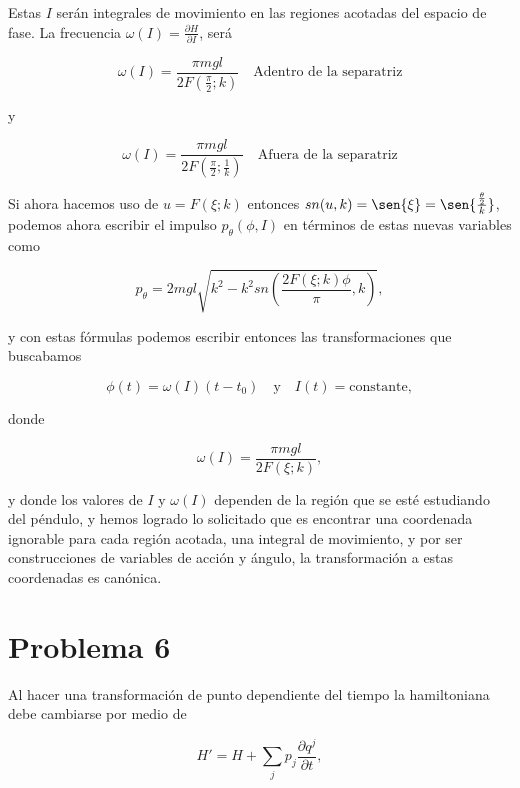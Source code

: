 \documentclass[a4paper,10pt]{article}
\numberwithin{equation}{section}
\begin{document}
Estas $I$ serán integrales de movimiento en las regiones acotadas del espacio de fase. 
La frecuencia $\omega(I) = \frac{\partial H}{\partial I}$, será 

\begin{equation}
 \omega(I) = \frac{\pi mgl}{2F\left(\frac{\pi}{2};k\right)} \quad \text{Adentro de la 
 separatriz}
\end{equation}

y 

\begin{equation}
 \omega(I) = \frac{\pi mgl}{2F\left(\frac{\pi}{2};\frac{1}{k}\right)} \quad \text{Afuera de la 
 separatriz}
\end{equation}

Si ahora hacemos uso de $u = F(\xi;k)$ entonces $sn(u,k) = \sen{\xi} = \sen{\frac{\frac{\theta}{2}}{k}}$, 
podemos ahora escribir el impulso $p_\theta(\phi,I)$ en términos de estas nuevas variables 
como 

\begin{equation}
 p_\theta = 2mgl \sqrt{k^2 - k^2sn\left(\frac{2F(\xi;k)\phi}{\pi},k \right)},
\end{equation}

y con estas fórmulas podemos escribir entonces las transformaciones que buscabamos 

\begin{equation}
 \phi(t) = \omega(I)(t-t_0) \quad \text{y} \quad I(t) = \text{constante},
\end{equation}

donde 

\begin{equation}
 \omega(I) = \frac{\pi mgl}{2F(\xi;k)},
\end{equation}

y donde los valores de $I$ y $\omega(I)$ dependen de la región que se esté estudiando 
del péndulo, y hemos logrado lo solicitado que es encontrar una coordenada ignorable 
para cada región acotada, una integral de movimiento, y por ser construcciones de variables 
de acción y ángulo, la transformación a estas coordenadas es canónica.

\section{Problema 6}

Al hacer una transformación de punto dependiente del tiempo la hamiltoniana 
debe cambiarse por medio de 

$$
H' = H + \sum_j p_j \frac{\partial q^j}{\partial t},
$$
\end{document}
